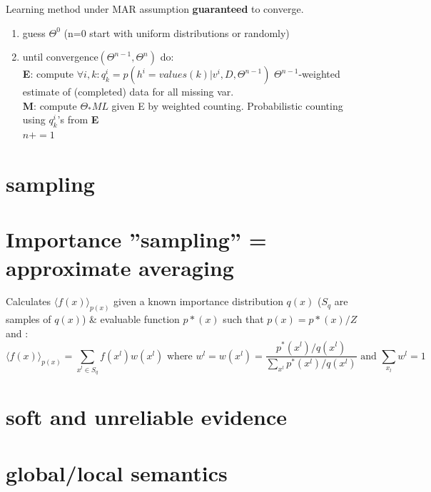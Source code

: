\documentclass[a4paper,10pt]{article}
\begin{document}
Learning method under MAR assumption \textbf{guaranteed} to converge.

\begin{enumerate}
 \item guess $\Theta^0$ (n=0 start with uniform distributions or randomly)
 \item until convergence$(\Theta^{n-1},\Theta^{n})$ do: \\
       \textbf{E}: compute $\forall i,k : q^i_{k} = p(h^i=values(k) | v^i, D, \Theta^{n-1})$ \hfill $\Theta^{n-1}$-weighted estimate of (completed) data for all missing var. \\
       \textbf{M}: compute $\Theta_*ML$ given E by weighted counting. \hfill Probabilistic counting using $q^i_k$'s from \textbf{E}\\
       $n += 1$
\end{enumerate}


\section{sampling}


\section{Importance ''sampling'' = approximate averaging}

Calculates $\langle f(x) \rangle_{p(x)}$ given a known importance distribution $q(x)$ ($S_q$ are samples of $q(x)$) \& evaluable function $p*(x)$ such that $p(x) = p*(x)/Z$ and    : 
$$ \langle f(x) \rangle_{p(x)} = \sum_{x^l \in S_q} f(x^l) w(x^l) \textrm{ where } w^l = w(x^l) = \frac{p^*(x^l)/q(x^l)}{\sum_{x^l} p^*(x^l)/q(x^l)} \textrm{ and } \sum_{x_l} w^l = 1$$

\section{soft and unreliable evidence}




\section{global/local semantics}
\end{document}
